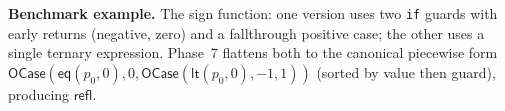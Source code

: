 \textbf{Benchmark example.}
The sign function: one version uses two \texttt{if} guards with
early returns (negative, zero) and a fallthrough positive case;
the other uses a single ternary expression.  Phase~7 flattens both
to the canonical piecewise form
$\mathsf{OCase}(\mathsf{eq}(p_0, 0), 0,
\mathsf{OCase}(\mathsf{lt}(p_0, 0), -1, 1))$
(sorted by value then guard), producing $\mathsf{refl}$.


